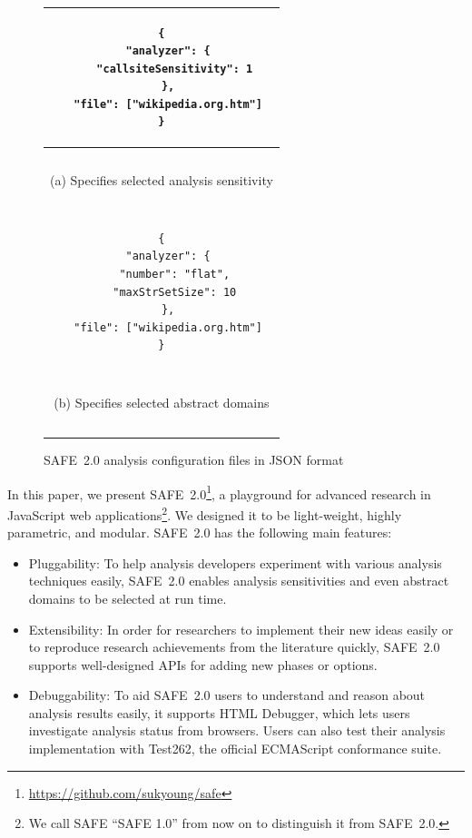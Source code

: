 \documentclass[10pt, conference]{IEEEtran}
\newcommand{\oldsafe}{{SAFE 1.0}\xspace}
\newcommand{\safe}{{SAFE~2.0}\xspace}
\newcommand{\htmldebug}{{\sf\small HTML Debugger}\xspace}
\begin{document}
\setcounter{figure}{0}
\begin{figure}[t]
\centering
\begin{tabular}{|c|}\hline
\begin{minipage}{.3\textwidth}
\footnotesize
\vspace*{.3em}
\begin{verbatim}
{
  "analyzer": {
    "callsiteSensitivity": 1
  },
  "file": ["wikipedia.org.htm"]
}
\end{verbatim}
\vspace*{.05em}
\end{minipage}
\\\hline
\multicolumn{1}{c}{~}\\[-.7em]
\multicolumn{1}{c}{\small (a) Specifies selected analysis sensitivity}\\
\multicolumn{1}{c}{~}\\[-.7em]
\hline
\begin{minipage}{.3\textwidth}
\footnotesize
\vspace*{.3em}
\begin{verbatim}
{
  "analyzer": {
    "number": "flat",
    "maxStrSetSize": 10
  },
  "file": ["wikipedia.org.htm"]
}
\end{verbatim}
\vspace*{.05em}
\end{minipage}\\\hline
\multicolumn{1}{c}{~}\\[-.7em]
\multicolumn{1}{c}{\small (b) Specifies selected abstract domains}\\
\multicolumn{1}{c}{~}\\[-.7em]
\end{tabular}
\caption{\small \safe analysis configuration files in JSON format}
\label{fig:pluggability}
\end{figure}


In this paper, we present \safe\footnote{
\url{https://github.com/sukyoung/safe}}, a playground
for advanced research in JavaScript web applications\footnote{
We call SAFE ``\oldsafe'' from now on to distinguish it from \safe.
}.  We designed it to be light-weight, highly parametric,
and modular.  \safe has the following main features:
\begin{itemize}
\item Pluggability: To help analysis developers experiment with
various analysis techniques easily, \safe enables analysis sensitivities
and even abstract domains to be selected at run time.

\item Extensibility: In order for researchers to implement their
new ideas easily or to reproduce research achievements from the
literature quickly, \safe supports well-designed APIs for adding new
phases or options.

\item Debuggability: To aid \safe users to understand and reason about
analysis results easily, it supports \htmldebug, which lets users
investigate analysis status from browsers.  Users can also
test their analysis implementation with Test262,
the official ECMAScript conformance suite.
\end{itemize}
\end{document}
